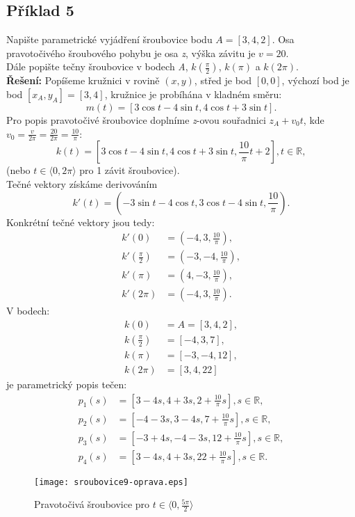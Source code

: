 \subsection*{Příklad 5}
Napište parametrické vyjádření šroubovice bodu $A=[3,4,2]$. Osa pravotočivého šroubového pohybu je osa \textit{z},
výška závitu je $v=20$. \\
Dále popište tečny šroubovice v bodech \textit{A}, $k\left(\frac{\pi}{2}\right)$, $k(\pi)$ a $k(2\pi)$.\\[10pt]
\textbf{Řešení: } 
Popíšeme kružnici v rovině $(x,y)$, střed je bod $[0,0]$, výchozí bod je bod $[x_A, y_A]=[3,4]$, kružnice je probíhána v kladném směru:
$$m(t) = \left[3\cos{t}-4\sin{t}, 4\cos{t}+3\sin{t}\right].$$
Pro popis pravotočivé šroubovice doplníme \textit{z}-ovou souřadnici $z_A+v_0t$, kde $v_0=\frac{v}{2\pi}=\frac{20}{2\pi}=\frac{10}{\pi}$:
$$k(t) = \left[3\cos{t}-4\sin{t}, 4\cos{t}+3\sin{t}, \frac{10}{\pi}t+2\right], t \in \mathbb{R},$$
(nebo $t \in \langle0, 2\pi\rangle$ pro 1 závit šroubovice). \\
Tečné vektory získáme derivováním
$$k'(t)=\left(-3\sin{t}-4\cos{t}, 3\cos{t}-4\sin{t}, \frac{10}{\pi}\right).$$
Konkrétní tečné vektory jsou tedy:
\begin{align*}
	k'(0)                        & =\left(-4,3,\frac{10}{\pi}\right),   \\
	k'\left(\frac{\pi}{2}\right) & = \left(-3,-4,\frac{10}{\pi}\right), \\
	k'(\pi)                      & = \left(4,-3,\frac{10}{\pi}\right),  \\
	k'(2\pi)                     & = \left(-4,3,\frac{10}{\pi}\right).  
\end{align*}
V bodech:
\begin{align*}
	k(0)                        & =A=\left[3,4,2\right],   \\
	k\left(\frac{\pi}{2}\right) & = \left[-4,3,7\right],   \\
	k(\pi)                      & = \left[-3,-4,12\right], \\
	k(2\pi)                     & = \left[3,4,22\right]    
\end{align*} 	
je parametrický popis tečen:
\begin{align*}
	p_1(s) & = \left[3-4s,4+3s,2+\frac{10}{\pi}s\right], s \in \mathbb{R},    \\
	p_2(s) & = \left[-4-3s,3-4s,7+\frac{10}{\pi}s\right], s \in \mathbb{R},   \\
	p_3(s) & = \left[-3+4s,-4-3s,12+\frac{10}{\pi}s\right], s \in \mathbb{R}, \\
	p_4(s) & = \left[3-4s,4+3s,22+\frac{10}{\pi}s\right], s \in \mathbb{R}.   
\end{align*} 	
\begin{figure}[H]
	\centering
	\texttt{[image: sroubovice9-oprava.eps]}
	\caption{Pravotočivá šroubovice pro $t \in \langle0, \frac{5\pi}{2}\rangle$}
	
\end{figure}	 	